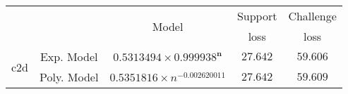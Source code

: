 \begin{tabular}{ccccc} 
\hline 
 &  & \multirow{2}{*}{Model} & Support & Challenge\tabularnewline 
 &  &  & loss  & loss\tabularnewline 
\hline 
\hline 
\multirow{2}{*}{c2d} & Exp. Model & $\mathbf{0.5313494\times 0.999938^{n}}$ & $\mathbf{27.642}$ & $\mathbf{59.606}$ \tabularnewline 
 & Poly. Model & $0.5351816\times n^{-0.002620011}$ & $27.642$ & $59.609$ \tabularnewline 
\hline 
\end{tabular} 

